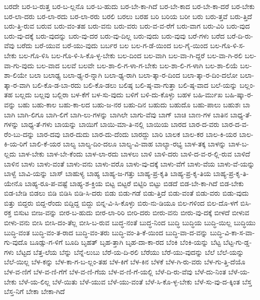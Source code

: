{ಬರದೇ
ಬರ-ಬ-ರುತ್ತ
ಬರ-ಬ-ಲ್ಲನೊ
ಬರ-ಬ-ಹುದು
ಬರ-ಬೇ-ಕಾ-ಗಿದೆ
ಬರ-ಬೇ-ಕಾದ
ಬರ-ಬೇ-ಕಾ-ದರೆ
ಬರ-ಬೇಕು
ಬರ-ಲಾ-ದರು
ಬರ-ಲಾ-ರದು
ಬರ-ಲಾ-ರರು
ಬರಲಿ
ಬರಲು
ಬರಹ
ಬರಿ
ಬರಿಯ
ಬರೀ
ಬರು
ಬರು-ತ್ತವೆ
ಬರು-ತ್ತಿದೆ
ಬರು-ತ್ತಿ-ರುವ
ಬರುವ
ಬರು-ವಂ-ತಹ
ಬರು-ವನು
ಬರು-ವರು
ಬರು-ವ-ವ-ರೆಗೆ
ಬರು-ವಾಗ
ಬರು-ವಿರಿ
ಬರು-ವುದ
ಬರು-ವು-ದಕ್ಕೆ
ಬರು-ವುದನ್ನು
ಬರು-ವು-ದರ
ಬರು-ವು-ದಿಲ್ಲ
ಬರು-ವುದು
ಬರು-ವುವು
ಬರೆ-ಗಳು
ಬರೆದ
ಬರೆ-ದಿ-ರು-ವೆವು
ಬರೆದು
ಬರೆ-ಯುವ
ಬರೆ-ಯು-ವುದು
ಬರ್ಬರ
ಬಲ
ಬಲ-ಗ-ಡೆ-ಯಿಂದ
ಬಲ-ಗೈ-ಯಿಂದ
ಬಲ-ಗೊ-ಳಿ-ಸ-ಬೇಕು
ಬಲ-ಗೊ-ಳಿಸಿ
ಬಲ-ಗೊ-ಳಿ-ಸಿ-ಕೊ-ಳ್ಳ-ಬೇಕು
ಬಲ-ದಿಂದ
ಬಲ-ವಾಗಿ
ಬಲ-ವಾ-ಗಿ-ದ್ದರೆ
ಬಲ-ವಾ-ಗಿ-ರಲಿ
ಬಲ-ವಾ-ಗು-ವುದು
ಬಲ-ವಾದ
ಬಲವೆ
ಬಲವೇ
ಬಲ-ಶಾ-ಲಿ-ಗ-ಳಾ-ಗ-ಬೇಕು
ಬಲ-ಶಾ-ಲಿ-ಗ-ಳಾಗಿ
ಬಲ-ಶಾ-ಲಿಯೆ
ಬಲ-ಶಾ-ಲಿಯೇ
ಬಲಾ
ಬಲಾಢ್ಯ
ಬಲಾ-ಢ್ಯ-ರ-ನ್ನಾಗಿ
ಬಲಾ-ಢ್ಯ-ರಾಗಿ
ಬಲಾ-ತ್ಕಾ-ರ-ದಿಂದ
ಬಲಾ-ತ್ಕಾ-ರ-ದಿಂ-ದಲೋ
ಬಲಾ-ತ್ಕಾ-ರ-ವಾಗಿ
ಬಲಿ-ಕೊ-ಡ-ಬಾ-ರದು
ಬಲಿ-ಕೊ-ಡಲು
ಬಲಿಷ್ಠ
ಬಲಿ-ಷ್ಠ-ವಾ-ಗುತ್ತಾ
ಬಲಿ-ಷ್ಠ-ವಾದ
ಬಲೆ-ಯನ್ನು
ಬಲ್ಲಂ-ತಹ
ಬಲ್ಲದು
ಬಲ್ಲವು
ಬಲ್ಲಿರಾ
ಬಳ-ಕೆಗೆ
ಬಳ-ಸು-ವುದು
ಬಳಿಗೆ
ಬಳಿ-ದು-ಕೊಳ್ಳು
ಬಹಳ
ಬಹಿ-ರ್ಮುಖ
ಬಹಿ-ಷ್ಕಾ-ರ-ವನ್ನು
ಬಹು
ಬಹು-ಕಾಲ
ಬಹು-ಕಾ-ಲದ
ಬಹು-ಜ-ನರ
ಬಹು-ದಿನ
ಬಹುದು
ಬಹುದೊ
ಬಹು-ಪಾಲು
ಬಹುಶಃ
ಬಾ
ಬಾಗಿ
ಬಾಗಿ-ಲಿಗೂ
ಬಾಗಿ-ಲಿಗೆ
ಬಾಗಿ-ಲು-ಗಳನ್ನು
ಬಾಗಿಲೇ
ಬಾಗು-ವೆವು
ಬಾಗ್
ಬಾಚಿ
ಬಾಣ-ಗಳ
ಬಾತಿನ
ಬಾಧ್ಯ-ತೆ-ಗಳನ್ನು
ಬಾಧ್ಯ-ತೆ-ಗಳು
ಬಾಯನ್ನು
ಬಾಯಿಗೆ
ಬಾಯಿ-ಮಾ-ತಿ-ನಲ್ಲಿ
ಬಾಯಿಯ
ಬಾರದ
ಬಾರ-ದ-ವರು
ಬಾರ-ದ-ವ-ರೆಂ-ಬು-ದನ್ನು
ಬಾರ-ದವು
ಬಾರ-ದುದು
ಬಾರ-ದು-ದೆಂದು
ಬಾರದ್ದು
ಬಾರಿ
ಬಾಲಕ
ಬಾಲ-ಕರ
ಬಾಲ-ಕಿ-ಯರ
ಬಾಲ-ಕಿ-ಯ-ರಿಗೆ
ಬಾಲಿ-ಕೆ-ಯರ
ಬಾಲ್ಯ
ಬಾಲ್ಯ-ದಿಂ-ದಲೂ
ಬಾಲ್ಯ-ವಿ-ವಾಹ
ಬಾಲ್ಯಾ-ರಭ್ಯ
ಬಾಳ-ತಕ್ಕ
ಬಾಳನ್ನು
ಬಾಳ-ಬ-ಲ್ಲದು
ಬಾಳ-ಬೇಕು
ಬಾಳ-ಬೇ-ಕೆಂದು
ಬಾಳ-ಲಾ-ರದು
ಬಾಳಲು
ಬಾಳಿ
ಬಾಳಿ-ದರು
ಬಾಳಿ-ದ-ವ-ರ-ಲ್ಲಿ-ರುವ
ಬಾಳಿದೆ
ಬಾಳಿನ
ಬಾಳು
ಬಾಳು-ವಂತೆ
ಬಾಳು-ವನು
ಬಾಳು-ವರೊ
ಬಾಳು-ವು-ದಕ್ಕೆ
ಬಾಳು-ವೆಗೆ
ಬಾಳು-ವೆಯ
ಬಾಳು-ವೆ-ಯನ್ನು
ಬಾಳ್ವೆ
ಬಾವಿ-ಯನ್ನು
ಬಾಸ್
ಬಾಹುಳ್ಯ
ಬಾಹ್ಯ
ಬಾಹ್ಯ-ಜ-ಗತ್ತು
ಬಾಹ್ಯ-ಪ್ರ-ಕೃತಿ
ಬಾಹ್ಯ-ಪ್ರ-ಕೃ-ತಿಯ
ಬಾಹ್ಯ-ಪ್ರ-ಕೃ-ತಿ-ಯೇನೊ
ಬಾಹ್ಯ-ರೂ-ಪ-ವಷ್ಟೆ
ಬಾಹ್ಯ-ಶ-ಕ್ತಿಯ
ಬಿಟ್ಟ
ಬಿಟ್ಟರೆ
ಬಿಟ್ಟಿರಿ
ಬಿಟ್ಟು
ಬಿಡದೆ
ಬಿಡ-ಬೇ-ಕಾ-ಗಿದೆ
ಬಿಡ-ಬೇಕು
ಬಿಡ-ಬೇಡಿ
ಬಿಡಲು
ಬಿಡಿ
ಬಿಡಿಸಿ
ಬಿಡಿ-ಸಿ-ದರು
ಬಿಡು
ಬಿಡು-ಗಡೆ
ಬಿಡು-ತ್ತಿದೆ
ಬಿಡು-ವಂತೆ
ಬಿಡು-ವರು
ಬಿಡು-ವುದು
ಬಿತ್ತು
ಬಿದ್ದರು
ಬಿದ್ದ-ರೆಂದು
ಬಿದ್ದಿದ್ದ
ಬಿದ್ದು
ಬಿನ್ನ-ವಿ-ಸಿ-ಕೊಳ್ಳು
ಬಿರು-ನು-ಡಿಯೂ
ಬಿಲ-ಗಳಿಂದ
ಬಿಲ-ದೊ-ಳಗೆ
ಬಿಸಿ-ರಕ್ತ
ಬಿಸುಟ
ಬೀಜ-ವನ್ನು
ಬೀರ-ಬ-ಹುದು
ಬೀರ-ಲಾ-ರಿರಿ
ಬೀರಿ-ದರು
ಬೀರು-ವನು
ಬೀರು-ವು-ದಕ್ಕೆ
ಬೀಳದೆ
ಬೀಳುವ
ಬೀಳು-ವನು
ಬೀಸಿ
ಬೀಸಿ-ದಂ-ತೆಲ್ಲ
ಬೀಸಿ-ಬ-ರುವ
ಬುದ್ಧ-ನಂತೆ
ಬುದ್ಧ-ನಿಂದ
ಬುದ್ಧಿ
ಬುದ್ಧಿಯ
ಬುದ್ಧಿ-ಯಿಲ್ಲ
ಬುದ್ಧಿಯು
ಬುದ್ಧಿ-ವಂತ
ಬುದ್ಧಿ-ವಂ-ತ-ರಾದ
ಬುದ್ಧಿ-ವಂ-ತರು
ಬುದ್ಧಿ-ವಂ-ತಿ-ಕೆ-ಯಿಂದ
ಬುದ್ಧಿ-ವಾ-ದ-ವನ್ನು
ಬುದ್ಧಿ-ವಿ-ಕಾ-ಸ-ವಾ-ಗು-ವುದೊ
ಬೂಡ್ಸು-ಗ-ಳಿಗೆ
ಬೂದಿ
ಬೃಹತ್
ಬೃಹ-ತ್ತಾಗಿ
ಬೃಹ-ದಾ-ಕಾ-ರದ
ಬೆಂಕಿ
ಬೆಂಕಿ-ಯನ್ನು
ಬೆಟ್ಟ
ಬೆಟ್ಟ-ಗು-ಡ್ಡ-ಗಳು
ಬೆಟ್ಟದ
ಬೆತ್ತ-ಲೆಯ
ಬೆನ್ನು
ಬೆನ್ನೆ-ಲುಬು
ಬೆರೆ-ಯ-ದಿ-ರಲಿ
ಬೆರೆಯು
ಬೆರೆ-ಯು-ವುದನ್ನು
ಬೆಲೆ
ಬೆಲೆ-ಯನ್ನು
ಬೆಲೆ-ಯಿಲ್ಲ
ಬೆಳ-ಕನ್ನು
ಬೆಳ-ಕಾ-ಗ-ಬ-ಲ್ಲಂ-ತಹ
ಬೆಳ-ಕಿಗೆ
ಬೆಳ-ಕಿನ
ಬೆಳಕೆ
ಬೆಳ-ಗಿ-ರು-ವರು
ಬೆಳ-ಗು-ತ್ತಿ-ದೆಯೊ
ಬೆಳ-ವ-ಣಿಗೆ
ಬೆಳ-ವ-ಣಿ-ಗೆಗೆ
ಬೆಳ-ವ-ಣಿ-ಗೆಯ
ಬೆಳ-ವ-ಣಿ-ಗೆ-ಯಲ್ಲಿ
ಬೆಳೆ-ದಿ-ರು-ವೆವು
ಬೆಳೆ-ದು-ನಿಂತ
ಬೆಳೆ-ಯ-ಬೇಕು
ಬೆಳೆ-ಯ-ಲಿಲ್ಲ
ಬೆಳೆ-ಯಿತು
ಬೆಳೆ-ಯುವ
ಬೆಳೆ-ಯು-ವಂತೆ
ಬೆಳೆ-ಸಿ-ಕೊ-ಳ್ಳ-ಬೇಕು
ಬೆಳೆ-ಸು-ವು-ದ-ಕ್ಕಿಂತ
ಬೆಸ್ತ
ಬೆಸ್ತ-ನಿಗೆ
ಬೇಕಾ
ಬೇಕಾ-ಗಿದೆ
}
